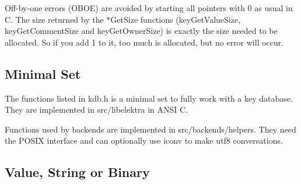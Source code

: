 Off-\/by-\/one errors (O\+B\+O\+E) are avoided by starting all pointers with 0 as usual in C. The size returned by the $\ast$\+Get\+Size functions (key\+Get\+Value\+Size, key\+Get\+Comment\+Size and key\+Get\+Owner\+Size) is exactly the size needed to be allocated. So if you add 1 to it, too much is allocated, but no error will occur.

\subsection*{Minimal Set}

The functions listed in kdb.\+h is a minimal set to fully work with a key database. They are implemented in src/libelektra in A\+N\+S\+I C.

Functions used by backends are implemented in src/backends/helpers. They need the P\+O\+S\+I\+X interface and can optionally use iconv to make utf8 conversations.

\subsection*{Value, String or Binary}

